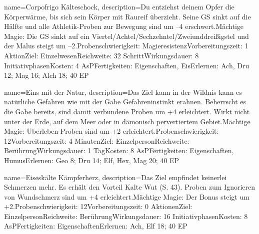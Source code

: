 {
    name={Corpofrigo Kälteschock},
    description={Du entziehst deinem Opfer die Körperwärme, bis sich sein Körper mit Raureif überzieht. Seine GS sinkt auf die Hälfte und alle Athletik-Proben zur Bewegung sind um –4 erschwert.\newline Mächtige Magie: Die GS sinkt auf ein Viertel/Achtel/Sechzehntel/Zweiunddreißigstel und der Malus steigt um –2.\newline Probenschwierigkeit: Magieresistenz\newline Vorbereitungszeit: 1 Aktion\newline Ziel: Einzelwesen\newline Reichweite: 32 Schritt\newline Wirkungsdauer: 8 Initiativphasen\newline Kosten: 4 AsP\newline Fertigkeiten: Eigenschaften, Eis\newline Erlernen: Ach, Dru 12; Mag 16; Alch 18; 40 EP}
}


{
    name={Eins mit der Natur},
    description={Das Ziel kann in der Wildnis kann es natürliche Gefahren wie mit der Gabe Gefahreninstinkt erahnen. Beherrscht es die Gabe bereits, sind damit verbundene Proben um +4 erleichtert. Wirkt nicht unter der Erde, auf dem Meer oder in dämonisch pervertiertem Gebiet.\newline Mächtige Magie: Überleben-Proben sind um +2 erleichtert.\newline Probenschwierigkeit: 12\newline Vorbereitungszeit: 4 Minuten\newline Ziel: Einzelperson\newline Reichweite: Berührung\newline Wirkungsdauer: 1 Tag\newline Kosten: 8 AsP\newline Fertigkeiten: Eigenschaften, Humus\newline Erlernen: Geo 8; Dru 14; Elf, Hex, Mag 20; 40 EP}
}


{
    name={Eiseskälte Kämpferherz},
    description={Das Ziel empfindet keinerlei Schmerzen mehr. Es erhält den Vorteil Kalte Wut (S. 43). Proben zum Ignorieren von Wundschmerz sind um +4 erleichtert.\newline Mächtige Magie: Der Bonus steigt um +2.\newline Probenschwierigkeit: 12\newline Vorbereitungszeit: 0 Aktionen\newline Ziel: Einzelperson\newline Reichweite: Berührung\newline Wirkungsdauer: 16 Initiativphasen\newline Kosten: 8 AsP\newline Fertigkeiten: Eigenschaften\newline Erlernen: Ach, Elf 18; 40 EP}
}


